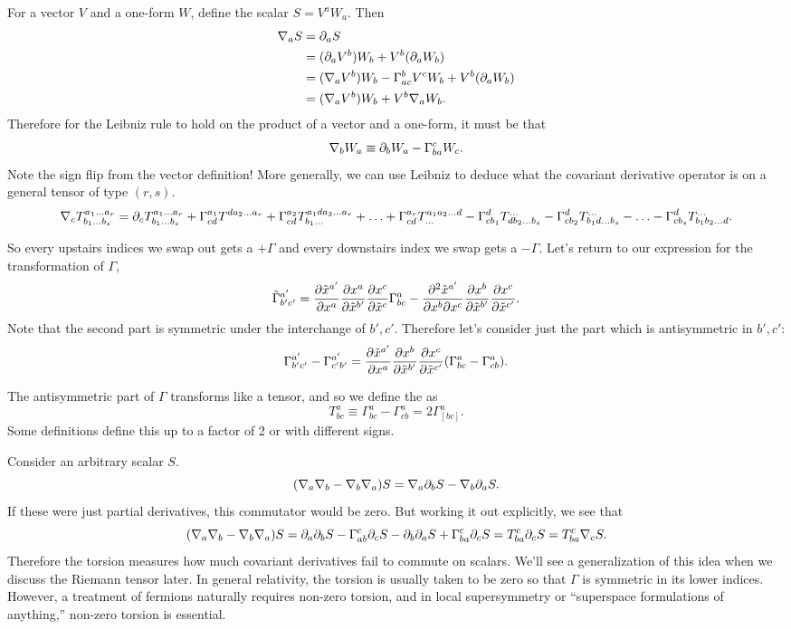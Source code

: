 For a vector $V$ and a one-form $W$, define the scalar $S=V^a W_a$. Then
\begin{align*}
\nabla_a S&= \partial_a S\\
&= (\partial_a V^b)W_b+ V^b(\partial_a W_b)\\
&= (\nabla_a V^b)W_b- \Gamma^b_{ac} V^c W_b+V^b(\partial_a W_b)\\
&= (\nabla_a V^b)W_b+ V^b \nabla_a W_b.
\end{align*}
Therefore for the Leibniz rule to hold on the product of a vector and a one-form, it must be that
$$\nabla_b W_a \equiv \partial_b W_a - \Gamma^c_{ba}W_c.$$
Note the sign flip from the vector definition! More generally, we can use Leibniz to deduce what the covariant derivative operator is on a general tensor of type $(r,s)$.
$$\nabla_c T^{a_1\ldots a_r}_{b_1\ldots b_s} = \partial_c T^{a_1\ldots a_r}_{b_1\ldots b_s}+ 
\Gamma^{a_1}_{cd} T^{da_2 \ldots a_r}+\Gamma^{a_2}_{cd} T^{a_1 d a_3 \ldots a_r}_{b_1\ldots}+\ldots + \Gamma^{a_r}_{cd}T^{a_1a_2\ldots d}_{\ldots} - \Gamma^d_{cb_1}T^{\ldots}_{db_2 \ldots b_s}- \Gamma^d_{cb_2} T^{\ldots}_{b_1 d \ldots b_s}-\ldots - \Gamma^d_{cb_s} T^{\ldots}_{b_1 b_2 \ldots d}.$$

So every upstairs indices we swap out gets a $+\Gamma$ and every downstairs index we swap gets a $-\Gamma$. Let's return to our expression for the transformation of $\Gamma,$
$$\tilde \Gamma^{a'}_{b'c'}=\frac{\partial \tilde x^{a'}}{\partial x^a} \frac{ \partial x^a}{\partial \tilde x^{b'}}\frac{\partial x^c}{\partial \tilde x^c} \Gamma^a_{bc}-\frac{\partial^2 \tilde x^{a'}}{\partial x^b \partial x^c}\frac{\partial x^b}{\partial \tilde x^{b'}}\frac{\partial x^c}{\partial\tilde x^{c'}}.$$
Note that the second part is symmetric under the interchange of $b',c'$. Therefore let's consider just the part which is antisymmetric in $b',c'$:
$$\Gamma^{a'}_{b'c'}-\Gamma^{a'}_{c'b'}=\frac{\partial \tilde x^{a'}}{\partial x^a}\frac{\partial x^b}{\partial \tilde x^{b'}}\frac{\partial x^c}{\partial \tilde x^{c'}}(\Gamma^a_{bc}-\Gamma^a_{cb}).$$
\begin{defn}
The antisymmetric part of $\Gamma$ transforms like a tensor, and so we define the  as
$$T^a_{bc}\equiv\Gamma^a_{bc}-\Gamma^a_{cb}=2\Gamma^a_{[bc]}.$$
Some definitions define this up to a factor of 2 or with different signs.
\end{defn}

Consider an arbitrary scalar $S$.
$$(\nabla_a \nabla_b-\nabla_b\nabla_a)S= \nabla_a \partial_b S- \nabla_b \partial_a S.$$
If these were just partial derivatives, this commutator would be zero. But working it out explicitly, we see that 
$$(\nabla_a \nabla_b-\nabla_b\nabla_a)S=\partial_a \partial_b S-\Gamma^c_{ab}\partial_c S -\partial_b \partial_a S + \Gamma^c_{ba}\partial_c S = T^c_{ba} \partial_c S = T^c_{ba}\nabla_c S.$$
Therefore the torsion measures how much covariant derivatives fail to commute on scalars. We'll see a generalization of this idea when we discuss the Riemann tensor later. In general relativity, the torsion is usually taken to be zero so that $\Gamma$ is symmetric in its lower indices. However, a treatment of fermions naturally requires non-zero torsion, and in local supersymmetry or ``superspace formulations of anything,'' non-zero torsion is essential.


